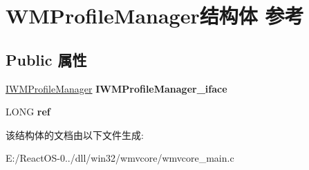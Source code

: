 \hypertarget{struct_w_m_profile_manager}{}\section{W\+M\+Profile\+Manager结构体 参考}
\label{struct_w_m_profile_manager}
\subsection*{Public 属性}
\begin{DoxyCompactItemize}
\item 
\mbox{\label{struct_w_m_profile_manager_a779dafda0182660d2e5ff8786a9472b0}} 
\hyperlink{interface_i_w_m_profile_manager}{I\+W\+M\+Profile\+Manager} {\bfseries I\+W\+M\+Profile\+Manager\+\_\+iface}
\item 
\mbox{\label{struct_w_m_profile_manager_a1fc8bb588e163238bbf67ae2febb200d}} 
L\+O\+NG {\bfseries ref}
\end{DoxyCompactItemize}


该结构体的文档由以下文件生成\+:\begin{DoxyCompactItemize}
\item 
E\+:/\+React\+O\+S-\/0../dll/win32/wmvcore/wmvcore\+\_\+main.\+c\end{DoxyCompactItemize}
